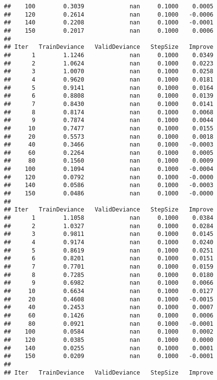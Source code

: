 \documentclass[]{article}
\begin{document}
\begin{verbatim}
##    100        0.3039             nan     0.1000    0.0005
##    120        0.2614             nan     0.1000   -0.0006
##    140        0.2208             nan     0.1000   -0.0001
##    150        0.2017             nan     0.1000    0.0006
## 
## Iter   TrainDeviance   ValidDeviance   StepSize   Improve
##      1        1.1246             nan     0.1000    0.0349
##      2        1.0624             nan     0.1000    0.0223
##      3        1.0070             nan     0.1000    0.0258
##      4        0.9620             nan     0.1000    0.0181
##      5        0.9141             nan     0.1000    0.0164
##      6        0.8808             nan     0.1000    0.0139
##      7        0.8430             nan     0.1000    0.0141
##      8        0.8174             nan     0.1000    0.0068
##      9        0.7874             nan     0.1000    0.0044
##     10        0.7477             nan     0.1000    0.0155
##     20        0.5573             nan     0.1000    0.0018
##     40        0.3466             nan     0.1000   -0.0003
##     60        0.2264             nan     0.1000    0.0005
##     80        0.1560             nan     0.1000    0.0009
##    100        0.1094             nan     0.1000   -0.0004
##    120        0.0792             nan     0.1000   -0.0000
##    140        0.0586             nan     0.1000   -0.0003
##    150        0.0486             nan     0.1000   -0.0000
## 
## Iter   TrainDeviance   ValidDeviance   StepSize   Improve
##      1        1.1058             nan     0.1000    0.0384
##      2        1.0327             nan     0.1000    0.0284
##      3        0.9811             nan     0.1000    0.0145
##      4        0.9174             nan     0.1000    0.0240
##      5        0.8619             nan     0.1000    0.0251
##      6        0.8201             nan     0.1000    0.0151
##      7        0.7701             nan     0.1000    0.0159
##      8        0.7285             nan     0.1000    0.0180
##      9        0.6982             nan     0.1000    0.0066
##     10        0.6634             nan     0.1000    0.0127
##     20        0.4608             nan     0.1000   -0.0015
##     40        0.2453             nan     0.1000    0.0007
##     60        0.1426             nan     0.1000    0.0006
##     80        0.0921             nan     0.1000   -0.0001
##    100        0.0584             nan     0.1000    0.0002
##    120        0.0385             nan     0.1000    0.0000
##    140        0.0255             nan     0.1000    0.0001
##    150        0.0209             nan     0.1000   -0.0001
## 
## Iter   TrainDeviance   ValidDeviance   StepSize   Improve

\end{verbatim}
\end{document}
